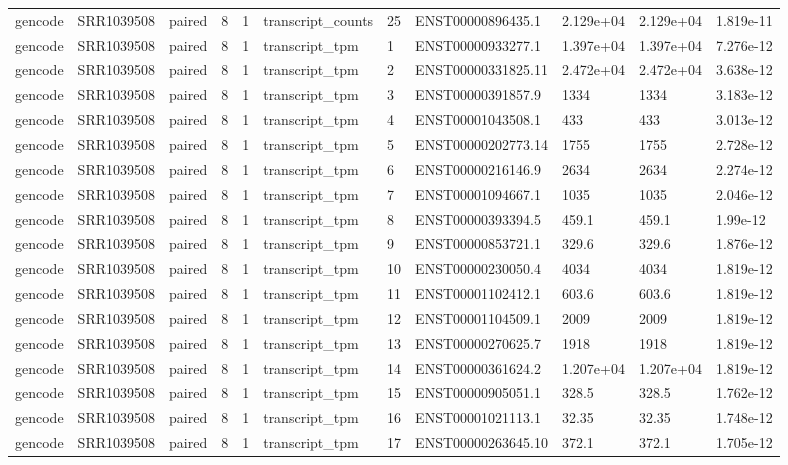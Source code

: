 \begin{tabular}{lllllllllll}
gencode & SRR1039508 & paired & 8 & 1 & transcript\_counts & 25 & ENST00000896435.1 & 2.129e+04 & 2.129e+04 & 1.819e-11 \\
gencode & SRR1039508 & paired & 8 & 1 & transcript\_tpm & 1 & ENST00000933277.1 & 1.397e+04 & 1.397e+04 & 7.276e-12 \\
gencode & SRR1039508 & paired & 8 & 1 & transcript\_tpm & 2 & ENST00000331825.11 & 2.472e+04 & 2.472e+04 & 3.638e-12 \\
gencode & SRR1039508 & paired & 8 & 1 & transcript\_tpm & 3 & ENST00000391857.9 & 1334 & 1334 & 3.183e-12 \\
gencode & SRR1039508 & paired & 8 & 1 & transcript\_tpm & 4 & ENST00001043508.1 & 433 & 433 & 3.013e-12 \\
gencode & SRR1039508 & paired & 8 & 1 & transcript\_tpm & 5 & ENST00000202773.14 & 1755 & 1755 & 2.728e-12 \\
gencode & SRR1039508 & paired & 8 & 1 & transcript\_tpm & 6 & ENST00000216146.9 & 2634 & 2634 & 2.274e-12 \\
gencode & SRR1039508 & paired & 8 & 1 & transcript\_tpm & 7 & ENST00001094667.1 & 1035 & 1035 & 2.046e-12 \\
gencode & SRR1039508 & paired & 8 & 1 & transcript\_tpm & 8 & ENST00000393394.5 & 459.1 & 459.1 & 1.99e-12 \\
gencode & SRR1039508 & paired & 8 & 1 & transcript\_tpm & 9 & ENST00000853721.1 & 329.6 & 329.6 & 1.876e-12 \\
gencode & SRR1039508 & paired & 8 & 1 & transcript\_tpm & 10 & ENST00000230050.4 & 4034 & 4034 & 1.819e-12 \\
gencode & SRR1039508 & paired & 8 & 1 & transcript\_tpm & 11 & ENST00001102412.1 & 603.6 & 603.6 & 1.819e-12 \\
gencode & SRR1039508 & paired & 8 & 1 & transcript\_tpm & 12 & ENST00001104509.1 & 2009 & 2009 & 1.819e-12 \\
gencode & SRR1039508 & paired & 8 & 1 & transcript\_tpm & 13 & ENST00000270625.7 & 1918 & 1918 & 1.819e-12 \\
gencode & SRR1039508 & paired & 8 & 1 & transcript\_tpm & 14 & ENST00000361624.2 & 1.207e+04 & 1.207e+04 & 1.819e-12 \\
gencode & SRR1039508 & paired & 8 & 1 & transcript\_tpm & 15 & ENST00000905051.1 & 328.5 & 328.5 & 1.762e-12 \\
gencode & SRR1039508 & paired & 8 & 1 & transcript\_tpm & 16 & ENST00001021113.1 & 32.35 & 32.35 & 1.748e-12 \\
gencode & SRR1039508 & paired & 8 & 1 & transcript\_tpm & 17 & ENST00000263645.10 & 372.1 & 372.1 & 1.705e-12 \\

\end{tabular}
